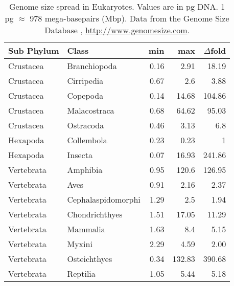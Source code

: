 \begin{table}[h]
\centering
\caption{Genome size spread in Eukaryotes. Values are in pg DNA. 1 pg
$\approx$ 978 mega-basepairs (Mbp). Data from the Genome Size Database
\citep{Gregory2018}, \url{http://www.genomesize.com}.}
\label{tab:genome-size-spread}
\begin{tabular}{@{}llrrr@{}}
\toprule
Sub Phylum & Class              & min  & max    & $\Delta$fold           \\
\midrule
Crustacea  & Branchiopoda       & 0.16 & 2.91   & 18.19        \\
Crustacea  & Cirripedia         & 0.67 & 2.6    & 3.88   \\
Crustacea  & Copepoda           & 0.14 & 14.68  & 104.86 \\
Crustacea  & Malacostraca       & 0.68 & 64.62  & 95.03  \\
Crustacea  & Ostracoda          & 0.46 & 3.13   & 6.8   \\
Hexapoda   & Collembola         & 0.23 & 0.23   & 1              \\
Hexapoda   & Insecta            & 0.07 & 16.93  & 241.86 \\
Vertebrata & Amphibia           & 0.95 & 120.6  & 126.95 \\
Vertebrata & Aves               & 0.91 & 2.16   & 2.37   \\
Vertebrata & Cephalaspidomorphi & 1.29 & 2.5    & 1.94   \\
Vertebrata & Chondrichthyes     & 1.51 & 17.05  & 11.29  \\
Vertebrata & Mammalia           & 1.63 & 8.4    & 5.15   \\
Vertebrata & Myxini             & 2.29 & 4.59   & 2.00   \\
Vertebrata & Osteichthyes       & 0.34 & 132.83 & 390.68 \\
Vertebrata & Reptilia           & 1.05 & 5.44   & 5.18    \\
\bottomrule
\end{tabular}
\end{table}


